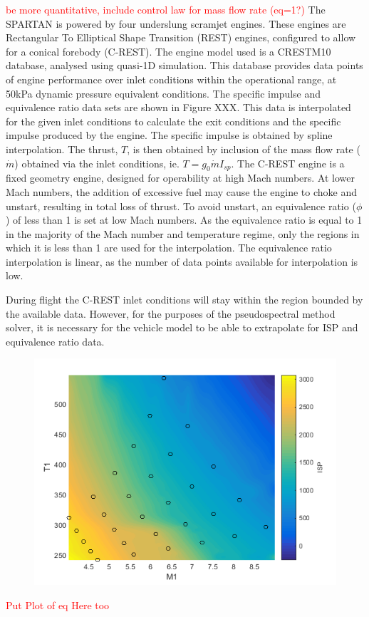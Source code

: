 \textcolor{red}{be more quantitative, include control law for mass flow rate (eq=1?)}
The SPARTAN is powered by four underslung scramjet engines. These engines are Rectangular To Elliptical Shape Transition (REST) engines, configured to allow for a conical forebody (C-REST). The engine model used is a CRESTM10 database\cite{Preller2017}, analysed using quasi-1D simulation.
This database provides data points of engine performance over inlet conditions within the operational range, at 50kPa dynamic pressure equivalent conditions. The specific impulse and equivalence ratio data sets are shown in Figure XXX. This data is interpolated for the given inlet conditions to calculate the exit conditions and the specific impulse produced by the engine. The specific impulse is obtained by spline interpolation. The thrust, $T$, is then obtained by inclusion of the mass flow rate ($\dot{m}$) obtained via the inlet conditions, ie. $T = g_0\dot{m}I_{sp}$.
The C-REST engine is a fixed geometry engine, designed for operability at high Mach numbers\cite{Preller2017}. At lower Mach numbers, the addition of excessive fuel may cause the engine to choke and unstart, resulting in total loss of thrust\cite{Preller2017}. To avoid unstart, an equivalence ratio ($\phi$) of less than 1 is set at low Mach numbers. As the equivalence ratio is equal to 1 in the majority of the Mach number and temperature regime, only the regions in which it is less than 1 are used for the interpolation. The equivalence ratio interpolation is linear, as the number of data points available for interpolation is low. 

During flight the C-REST inlet conditions will stay within the region bounded by the available data. However, for the purposes of the pseudospectral method solver, it is necessary for the vehicle model to be able to extrapolate for ISP and equivalence ratio data. 

\begin{figure}
	\centering
	\includegraphics[width=0.7\linewidth]{figures/3_vehicle_design/ISPinterp}
	\caption{}
	\label{fig:ISPinterp}
\end{figure}
\textcolor{red}{Put Plot of eq Here too}


